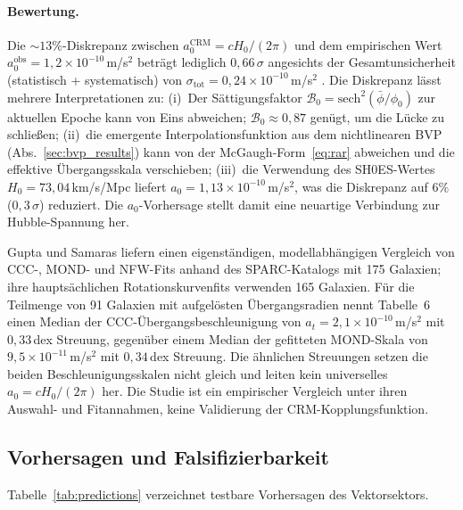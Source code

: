 \documentclass[aps,prd,twocolumn,superscriptaddress,nofootinbib]{revtex4-2}
\begin{document}
\paragraph{Bewertung.}
Die $\sim 13\%$-Diskrepanz zwischen $a_0^{\mathrm{CRM}} = cH_0/(2\pi)$ und dem empirischen Wert $a_0^{\mathrm{obs}} = 1{,}2 \times 10^{-10}$\,m/s$^2$ betr\"agt lediglich $0{,}66\,\sigma$ angesichts der Gesamtunsicherheit (statistisch + systematisch) von $\sigma_{\mathrm{tot}} = 0{,}24 \times 10^{-10}$\,m/s$^2$ \cite{McGaugh2016}. Die Diskrepanz l\"asst mehrere Interpretationen zu: (i)~Der S\"attigungsfaktor $\mathcal{B}_0 = \mathrm{sech}^2(\bar{\phi}/\phi_0)$ zur aktuellen Epoche kann von Eins abweichen; $\mathcal{B}_0 \approx 0{,}87$ gen\"ugt, um die L\"ucke zu schlie\ss{}en; (ii)~die emergente Interpolationsfunktion aus dem nichtlinearen BVP (Abs.~\ref{sec:bvp_results}) kann von der McGaugh-Form~\eqref{eq:rar} abweichen und die effektive \"Ubergangsskala verschieben; (iii)~die Verwendung des SH0ES-Wertes $H_0 = 73{,}04$\,km/s/Mpc \cite{Riess2022} liefert $a_0 = 1{,}13 \times 10^{-10}$\,m/s$^2$, was die Diskrepanz auf $6\%$ ($0{,}3\,\sigma$) reduziert. Die $a_0$-Vorhersage stellt damit eine neuartige Verbindung zur Hubble-Spannung her.

Gupta und Samaras \cite{Gupta2026} liefern einen eigenständigen, modellabhängigen Vergleich von CCC-, MOND- und NFW-Fits anhand des SPARC-Katalogs mit 175 Galaxien; ihre hauptsächlichen Rotationskurvenfits verwenden 165 Galaxien. Für die Teilmenge von 91 Galaxien mit aufgelösten Übergangsradien nennt Tabelle~6 einen Median der CCC-Übergangsbeschleunigung von $a_t=2{,}1\times10^{-10}$\,m/s$^2$ mit $0{,}33$\,dex Streuung, gegenüber einem Median der gefitteten MOND-Skala von $9{,}5\times10^{-11}$\,m/s$^2$ mit $0{,}34$\,dex Streuung. Die ähnlichen Streuungen setzen die beiden Beschleunigungsskalen nicht gleich und leiten kein universelles $a_0=cH_0/(2\pi)$ her. Die Studie ist ein empirischer Vergleich unter ihren Auswahl- und Fitannahmen, keine Validierung der CRM-Kopplungsfunktion.

\subsection{Vorhersagen und Falsifizierbarkeit}

Tabelle~\ref{tab:predictions} verzeichnet testbare Vorhersagen des Vektorsektors.
\end{document}
